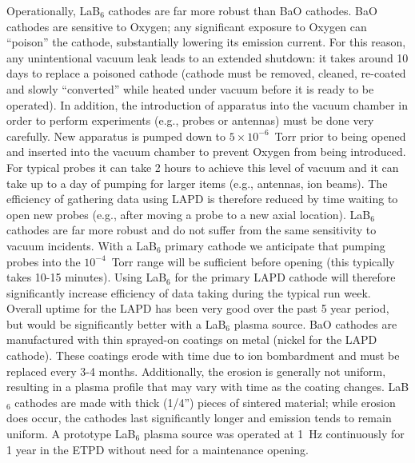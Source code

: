 \documentclass[11pt]{article}
\begin{document}
Operationally, LaB$_6$ cathodes are far more robust than BaO cathodes.
BaO cathodes are sensitive to Oxygen; any significant exposure to
Oxygen can ``poison'' the cathode, substantially lowering its
emission current. For this reason, any unintentional vacuum leak leads
to an extended shutdown: it takes around 10 days to replace a poisoned
cathode (cathode must be removed, cleaned, re-coated and slowly
``converted'' while heated under vacuum before it is ready to be
operated). In addition, the introduction of apparatus into the vacuum
chamber in order to perform experiments (e.g., probes or antennas) must
be done very carefully. New apparatus is pumped down to $5\times
10^{-6}$~Torr prior to being opened and inserted into the vacuum
chamber to prevent Oxygen from being introduced. For typical probes it
can take 2 hours to achieve this level of vacuum and it can take up to
a day of pumping for larger items (e.g., antennas, ion beams). The
efficiency of gathering data using LAPD is therefore reduced by time
waiting to open new probes (e.g.,  after moving a probe to a new axial
location). LaB$_6$ cathodes are far more robust and do not suffer from
the same sensitivity to vacuum incidents.  With a LaB$_6$ primary
cathode we anticipate that pumping probes into the $10^{-4}$~Torr
range will be sufficient before opening (this typically takes 10-15
minutes).  Using LaB$_{6}$ for the primary LAPD cathode will therefore
significantly increase efficiency of data taking during the typical
run week. Overall uptime for the LAPD has been very good over the past
5 year period, but would be significantly better with a LaB$_6$ plasma
source. BaO cathodes are manufactured with thin sprayed-on coatings on
metal (nickel for the LAPD cathode).  These coatings erode with time
due to ion bombardment and must be replaced every 3-4 months.
Additionally, the erosion is generally not uniform, resulting in a
 plasma profile that may vary with time as the coating
changes.  LaB$_6$ cathodes are made with thick (1/4'') pieces of
sintered material; while erosion does occur, the cathodes last
significantly longer and emission tends to remain uniform. A prototype
LaB$_6$ plasma source was operated at 1~Hz continuously for 1 year in
the ETPD without need for a maintenance opening.
\end{document}
